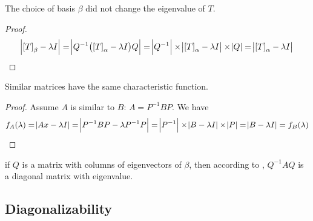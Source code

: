 \begin{theorem}
    The choice of basis $\beta$ did not change the eigenvalue of $T$. 
\end{theorem}
\begin{proof}
    \begin{equation*}
        \absolutevalue{\coordinate{T}_\beta - \lambda I} = \absolutevalue{Q^{-1} \mleft( \coordinate{T}_\alpha - \lambda I \mright) Q} = \absolutevalue{Q^{-1}} \times \absolutevalue{\coordinate{T}_\alpha - \lambda I } \times \absolutevalue{Q} = \absolutevalue{\coordinate{T}_\alpha - \lambda I } 
    \end{equation*}
\end{proof}

\begin{theorem}
Similar matrices have the same characteristic function.    
\end{theorem}
\begin{proof}
    Assume $A$ is similar to $B$: $A = P^{-1} B P$. We have
    \begin{equation*}
    f_A(\lambda) = \abs{Ax - \lambda I} = \abs{P^{-1} B P - \lambda P^{-1} P} = \abs{P^{-1}} \times \abs{B - \lambda I } \times \abs{P} = \abs{B - \lambda I } = f_B(\lambda)
    \end{equation*}
\end{proof}




\begin{theorem}
    if $Q$ is a matrix with columns of eigenvectors of $\beta$, then according to  , $Q^{-1} A Q$ is a diagonal matrix with eigenvalue.
\end{theorem}



\subsection{Diagonalizability}


